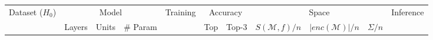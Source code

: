 
\centering

	\begin{tabular}{l ccr rrrrrrr}
		\toprule
        \multirow{2}{*}{Dataset ($H_0$)} & \multicolumn{3}{c}{Model} & \multirow{2}{*}{Training} & \multicolumn{2}{c}{Accuracy} & \multicolumn{3}{c}{Space}& \multirow{2}{*}{Inference} \\
                                           \cmidrule(lr){2-4}                                      \cmidrule(lr){6-7}             \cmidrule(lr){8-10}
                                         & Layers & Units     & \# Param       &                          & Top       & Top-3            & $S(ℳ,f) / n$ & $|enc(ℳ)| / n$ & $\Sigma / n$& \\


\end{tabular}
